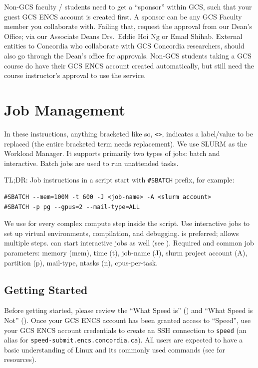 \documentclass{easychair}
\begin{document}
Non-GCS faculty / students need to get a ``sponsor'' within GCS, such that
your guest GCS ENCS account is created first. A sponsor can be any GCS Faculty member
you collaborate with. Failing that, request the approval from our Dean's Office;
via our Associate Deans Drs.\ Eddie Hoi Ng or Emad Shihab.
%
External entities to Concordia who collaborate with GCS Concordia researchers,
should also go through the Dean's office for approvals.
%
Non-GCS students taking a GCS course do have their GCS ENCS account created automatically,
but still need the course instructor's approval to use the service.

\section{Job Management}
\label{sect:job-management}

In these instructions, anything bracketed like so, \verb+<>+, indicates a
label/value to be replaced (the entire bracketed term needs replacement).
%
We use SLURM as the Workload Manager.
It supports primarily two types of jobs: batch and interactive.
Batch jobs are used to run unattended tasks.

TL;DR:
Job instructions in a script start with \verb+#SBATCH+ prefix, for example:
\begin{verbatim}
#SBATCH --mem=100M -t 600 -J <job-name> -A <slurm account>
#SBATCH -p pg --gpus=2 --mail-type=ALL
\end{verbatim}
%
We use  for every complex compute step inside the script.
Use interactive jobs to set up virtual environments, compilation, and debugging.
 is preferred; allows multiple steps.
 can start interactive jobs as well (see ).
Required and common job parameters: memory (mem), time (t), job-name (J), slurm project account (A), partition (p), mail-type, ntasks (n), cpus-per-task.

\subsection{Getting Started}

Before getting started, please review the ``What Speed is'' ()
and ``What Speed is Not'' ().
Once your GCS ENCS account has been granted access to ``Speed'',
use your GCS ENCS account credentials to create an SSH connection to 
\texttt{speed} (an alias for \texttt{speed-submit.encs.concordia.ca}). 
%
All users are expected to have a basic understanding of
Linux and its commonly used commands (see  for resources).
\end{document}
